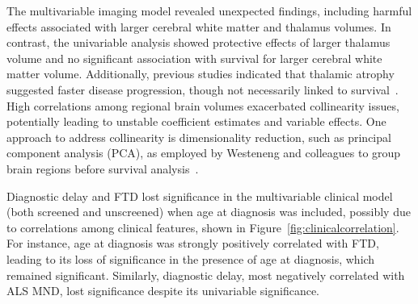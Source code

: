 The multivariable imaging model revealed unexpected findings, including harmful effects associated with larger cerebral white matter and thalamus volumes.
In contrast, the univariable analysis showed protective effects of larger thalamus volume and no significant association with survival for larger cerebral white matter volume.
Additionally, previous studies indicated that thalamic atrophy suggested faster disease progression, though not necessarily linked to survival~\cite{sendaStructuralMRICorrelates2017,dieckmannCorticalSubcorticalGrey2022}.
High correlations among regional brain volumes exacerbated collinearity issues, potentially leading to unstable coefficient estimates and variable effects.
One approach to address collinearity is dimensionality reduction, such as principal component analysis (PCA), as employed by Westeneng and colleagues to group brain regions before survival analysis~\cite{westenengSubcorticalStructuresAmyotrophic2015}.
%
%

Diagnostic delay and FTD lost significance in the multivariable clinical model (both screened and unscreened) when age at diagnosis was included, possibly due to correlations among clinical features, shown in Figure~\ref{fig:clinicalcorrelation}.
For instance, age at diagnosis was strongly positively correlated with FTD, leading to its loss of significance in the presence of age at diagnosis, which remained significant.
Similarly, diagnostic delay, most negatively correlated with ALS MND, lost significance despite its univariable significance.



